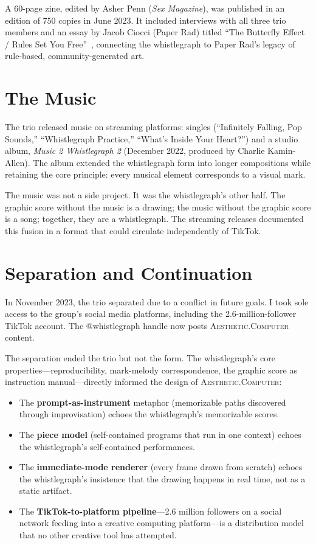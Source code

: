 \documentclass[10pt,letterpaper,twocolumn]{article}
\newcommand{\ac}{\textsc{Aesthetic.Computer}}
\begin{document}
A 60-page zine, edited by Asher Penn (\emph{Sex Magazine}), was published in an edition of 750 copies in June 2023. It included interviews with all three trio members and an essay by Jacob Ciocci (Paper Rad) titled ``The Butterfly Effect / Rules Set You Free''~\citep{ciocci2023butterfly}, connecting the whistlegraph to Paper Rad's legacy of rule-based, community-generated art.

\section{The Music}

The trio released music on streaming platforms: singles (``Infinitely Falling, Pop Sounds,'' ``Whistlegraph Practice,'' ``What's Inside Your Heart?'') and a studio album, \emph{Music 2 Whistlegraph 2} (December 2022, produced by Charlie Kamin-Allen). The album extended the whistlegraph form into longer compositions while retaining the core principle: every musical element corresponds to a visual mark.

The music was not a side project. It was the whistlegraph's other half. The graphic score without the music is a drawing; the music without the graphic score is a song; together, they are a whistlegraph. The streaming releases documented this fusion in a format that could circulate independently of TikTok.

\section{Separation and Continuation}

In November 2023, the trio separated due to a conflict in future goals. I took sole access to the group's social media platforms, including the 2.6-million-follower TikTok account. The @whistlegraph handle now posts \ac{} content.

The separation ended the trio but not the form. The whistlegraph's core properties---reproducibility, mark-melody correspondence, the graphic score as instruction manual---directly informed the design of \ac{}:

\begin{itemize}
  \item The \textbf{prompt-as-instrument} metaphor (memorizable paths discovered through improvisation) echoes the whistlegraph's memorizable scores.
  \item The \textbf{piece model} (self-contained programs that run in one context) echoes the whistlegraph's self-contained performances.
  \item The \textbf{immediate-mode renderer} (every frame drawn from scratch) echoes the whistlegraph's insistence that the drawing happens in real time, not as a static artifact.
  \item The \textbf{TikTok-to-platform pipeline}---2.6 million followers on a social network feeding into a creative computing platform---is a distribution model that no other creative tool has attempted.
\end{itemize}
\end{document}
